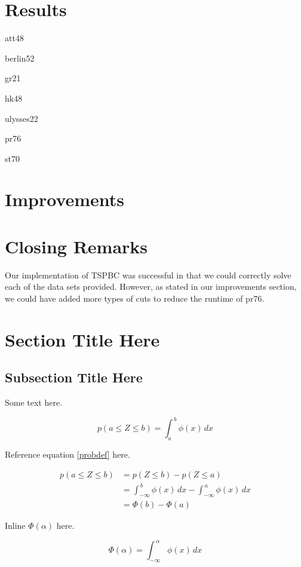 \documentclass{article}
\begin{document}
\section{Results}
    att48

    berlin52

    gr21

    hk48

    ulysses22

    pr76

    st70

\section{Improvements}

\section{Closing Remarks}
Our implementation of TSPBC was successful
in that we could correctly solve
each of the data sets provided.
However, as stated in our improvements section,
we could have added more types of cuts
to reduce the runtime of pr76.


\section{Section Title Here}

\subsection{Subsection Title Here}

\begin{flushleft}

Some text here.

\begin{equation} \label{probdef}
  p(a \le Z \le b) = \int_{a}^{\,b} \phi(x) \,dx
\end{equation}

Reference equation \autoref{probdef} here.

\begin{align*}
  p(a \le Z \le b)  &=  p(Z \le b) - p(Z \le a) \\
                    &=  \int_{-\infty}^{\,b} \phi(x) \,dx
                        -
                        \int_{-\infty}^{\,a} \phi(x) \,dx \\
                    &=  \Phi(b) - \Phi(a)
\end{align*}

Inline $\Phi(\alpha)$ here.

\begin{equation*}
  \Phi(\alpha)  = \int_{-\infty}^{\,\alpha} \phi(x) \,dx
\end{equation*}

% 

\end{flushleft}
\end{document}
